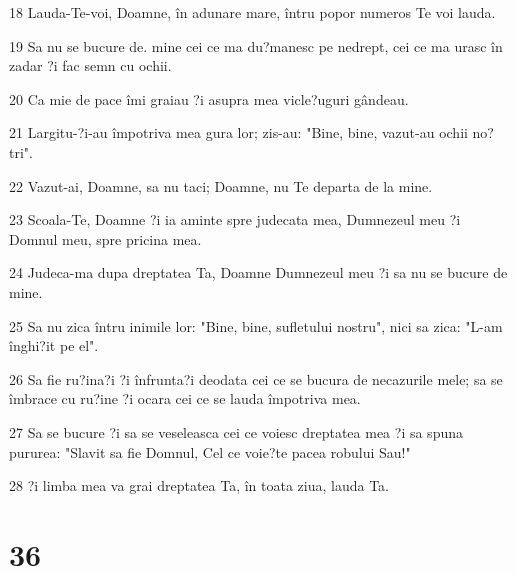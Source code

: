 \par 18 Lauda-Te-voi, Doamne, în adunare mare, întru popor numeros Te voi lauda.
\par 19 Sa nu se bucure de. mine cei ce ma du?manesc pe nedrept, cei ce ma urasc în zadar ?i fac semn cu ochii.
\par 20 Ca mie de pace îmi graiau ?i asupra mea vicle?uguri gândeau.
\par 21 Largitu-?i-au împotriva mea gura lor; zis-au: "Bine, bine, vazut-au ochii no?tri".
\par 22 Vazut-ai, Doamne, sa nu taci; Doamne, nu Te departa de la mine.
\par 23 Scoala-Te, Doamne ?i ia aminte spre judecata mea, Dumnezeul meu ?i Domnul meu, spre pricina mea.
\par 24 Judeca-ma dupa dreptatea Ta, Doamne Dumnezeul meu ?i sa nu se bucure de mine.
\par 25 Sa nu zica întru inimile lor: "Bine, bine, sufletului nostru", nici sa zica: "L-am înghi?it pe el".
\par 26 Sa fie ru?ina?i ?i înfrunta?i deodata cei ce se bucura de necazurile mele; sa se îmbrace cu ru?ine ?i ocara cei ce se lauda împotriva mea.
\par 27 Sa se bucure ?i sa se veseleasca cei ce voiesc dreptatea mea ?i sa spuna pururea: "Slavit sa fie Domnul, Cel ce voie?te pacea robului Sau!"
\par 28 ?i limba mea va grai dreptatea Ta, în toata ziua, lauda Ta.

\chapter{36}

